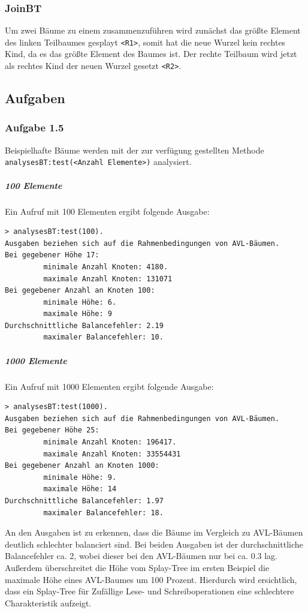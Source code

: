\subsubsection{JoinBT}\label{par:joinbt}
Um zwei Bäume zu einem zusammenzuführen wird zunächst das größte Element des linken Teilbaumes
gesplayt \verb|<R1>|, somit hat die neue Wurzel kein rechtes Kind, da es das größte Element des
Baumes ist.
Der rechte Teilbaum wird jetzt als rechtes Kind der neuen Wurzel gesetzt \verb|<R2>|.

\subsection{Aufgaben}\label{subsec:aufgaben2}

\subsubsection{Aufgabe 1.5}
Beispielhafte Bäume werden mit der zur verfügung gestellten Methode\\
\verb|analysesBT:test(<Anzahl Elemente>)| analysiert.

\subparagraph{100 Elemente}
Ein Aufruf mit 100 Elementen ergibt folgende Ausgabe:
\begin{verbatim}
> analysesBT:test(100).
Ausgaben beziehen sich auf die Rahmenbedingungen von AVL-Bäumen.
Bei gegebener Höhe 17:
         minimale Anzahl Knoten: 4180.
         maximale Anzahl Knoten: 131071
Bei gegebener Anzahl an Knoten 100:
         minimale Höhe: 6.
         maximale Höhe: 9
Durchschnittliche Balancefehler: 2.19
         maximaler Balancefehler: 10.
\end{verbatim}

\subparagraph{1000 Elemente}
Ein Aufruf mit 1000 Elementen ergibt folgende Ausgabe:
\begin{verbatim}
> analysesBT:test(1000).
Ausgaben beziehen sich auf die Rahmenbedingungen von AVL-Bäumen.
Bei gegebener Höhe 25:
         minimale Anzahl Knoten: 196417.
         maximale Anzahl Knoten: 33554431
Bei gegebener Anzahl an Knoten 1000:
         minimale Höhe: 9.
         maximale Höhe: 14
Durchschnittliche Balancefehler: 1.97
         maximaler Balancefehler: 18.
\end{verbatim}

An den Ausgaben ist zu erkennen, dass die Bäume im Vergleich zu AVL-Bäumen deutlich schlechter
balanciert sind.
Bei beiden Ausgaben ist der durchschnittliche Balancefehler ca. 2, wobei dieser bei den
AVL-Bäumen nur bei ca. 0.3 lag.
Außerdem überschreitet die Höhe vom Splay-Tree im ersten Beispiel die maximale Höhe eines AVL-Baumes
um 100 Prozent.
Hierdurch wird ersichtlich, dass ein Splay-Tree für Zufällige Lese- und Schreiboperationen eine
schlechtere Charakteristik aufzeigt.

